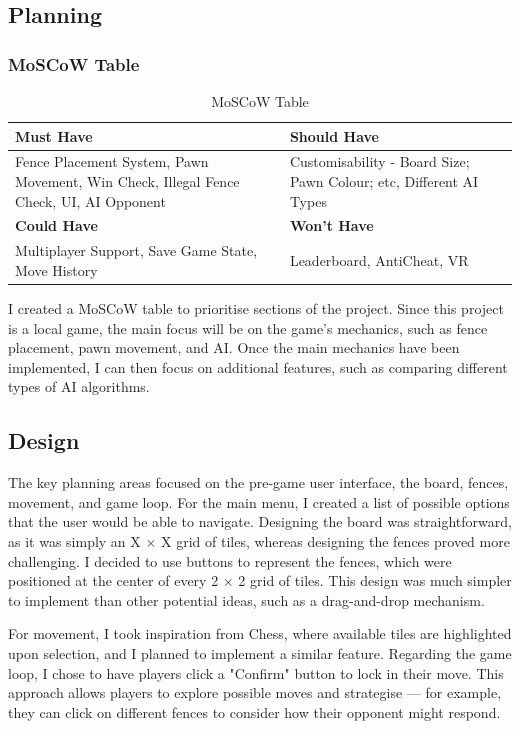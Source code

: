 \documentclass[progress]{cmpreport}
\begin{document}
\subsection{Planning}

\subsubsection{MoSCoW Table}

\begin{table}[h!]
\centering
\begin{tabular}{|>{\raggedright\arraybackslash}m{6cm}|>{\raggedright\arraybackslash}m{6cm}|}
\hline
\textbf{Must Have} & \textbf{Should Have} \\ \hline
Fence Placement System, Pawn Movement, Win Check, Illegal Fence Check, UI, AI Opponent & Customisability - Board Size; Pawn Colour; etc, Different AI Types \\ \hline
\textbf{Could Have} & \textbf{Won't Have} \\ \hline
Multiplayer Support, Save Game State, Move History & Leaderboard, AntiCheat, VR\\ \hline
\end{tabular}
\caption{MoSCoW Table}
\label{tab:moscow}
\end{table}

\noindent I created a MoSCoW table to prioritise sections of the project. Since this project is a local game, the main focus will be on the game's mechanics, such as fence placement, pawn movement, and AI. Once the main mechanics have been implemented, I can then focus on additional features, such as comparing different types of AI algorithms.

\subsection{Design}
The key planning areas focused on the pre-game user interface, the board, fences, movement, and game loop. For the main menu, I created a list of possible options that the user would be able to navigate. Designing the board was straightforward, as it was simply an X × X grid of tiles, whereas designing the fences proved more challenging. I decided to use buttons to represent the fences, which were positioned at the center of every 2 × 2 grid of tiles. This design was much simpler to implement than other potential ideas, such as a drag-and-drop mechanism.

\noindent For movement, I took inspiration from Chess, where available tiles are highlighted upon selection, and I planned to implement a similar feature. Regarding the game loop, I chose to have players click a "Confirm" button to lock in their move. This approach allows players to explore possible moves and strategise — for example, they can click on different fences to consider how their opponent might respond.
\end{document}
